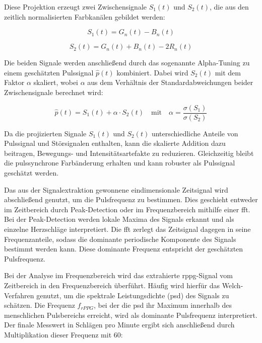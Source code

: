 \begin{itemize}
    Diese Projektion erzeugt zwei Zwischensignale $S_1(t)$ und $S_2(t)$, die aus den zeitlich normalisierten Farbkanälen gebildet werden:

    \begin{equation}
    S_1(t) = G_n(t) - B_n(t)
    \end{equation}

    \begin{equation}
    S_2(t) = G_n(t) + B_n(t) - 2R_n(t)
    \end{equation}

    Die beiden Signale werden anschließend durch das sogenannte Alpha-Tuning zu einem geschätzten Pulssignal $\hat{p}(t)$ kombiniert. Dabei wird $S_2(t)$ mit dem Faktor $\alpha$ skaliert, wobei $\alpha$ aus dem Verhältnis der Standardabweichungen beider Zwischensignale berechnet wird:

    \begin{equation}
    \hat{p}(t) = S_1(t) + \alpha \cdot S_2(t) \quad \text{mit} \quad \alpha = \frac{\sigma(S_1)}{\sigma(S_2)}
    \end{equation}

    Da die projizierten Signale $S_1(t)$ und $S_2(t)$ unterschiedliche Anteile von Pulssignal und Störsignalen enthalten, kann die skalierte Addition dazu beitragen, Bewegungs- und Intensitätsartefakte zu reduzieren. Gleichzeitig bleibt die pulssynchrone Farbänderung erhalten und kann robuster als Pulssignal geschätzt werden.
\end{itemize}

Das aus der Signalextraktion gewonnene eindimensionale Zeitsignal wird abschließend genutzt, um die Pulsfrequenz zu bestimmen. Dies geschieht entweder im Zeitbereich durch Peak-Detection oder im Frequenzbereich mithilfe einer \ac{fft}. Bei der Peak-Detection werden lokale Maxima des Signals erkannt und als einzelne Herzschläge interpretiert. Die \ac{fft} zerlegt das Zeitsignal dagegen in seine Frequenzanteile, sodass die dominante periodische Komponente des Signals bestimmt werden kann. Diese dominante Frequenz entspricht der geschätzten Pulsfrequenz.

Bei der Analyse im Frequenzbereich wird das extrahierte \ac{rppg}-Signal vom Zeitbereich in den Frequenzbereich überführt. Häufig wird hierfür das Welch-Verfahren genutzt, um die spektrale Leistungsdichte (\ac{psd}) des Signals zu schätzen. Die Frequenz $f_{rPPG}$, bei der die \ac{psd} ihr Maximum innerhalb des menschlichen Pulsbereichs erreicht, wird als dominante Pulsfrequenz interpretiert. Der finale Messwert in Schlägen pro Minute ergibt sich anschließend durch Multiplikation dieser Frequenz mit 60:


